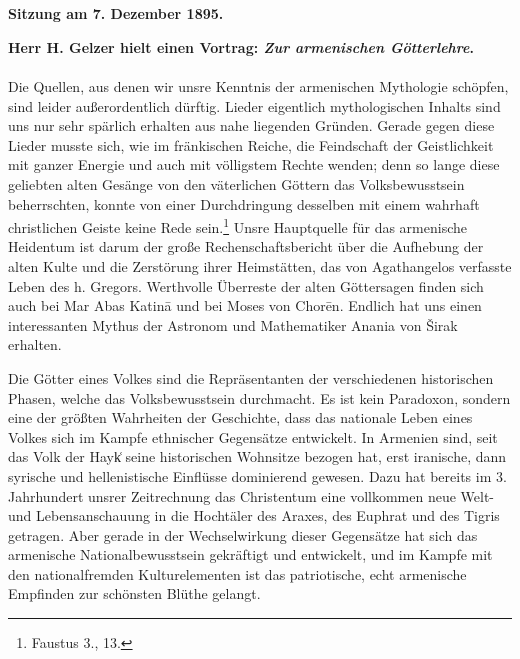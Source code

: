 \documentclass{article}
\begin{document}
\section*{}
\begin{center}
\Large
\textbf{Sitzung am 7. Dezember 1895.}

\textbf{Herr H. Gelzer hielt einen Vortrag: \emph{Zur armenischen Götterlehre}.}
\end{center}
\paragraph{}
Die Quellen, aus denen wir unsre Kenntnis der armenischen Mythologie schöpfen, sind leider außerordentlich dürftig. Lieder eigentlich mythologischen Inhalts sind uns nur sehr spärlich erhalten aus nahe liegenden Gründen. Gerade gegen diese Lieder musste sich, wie im fränkischen Reiche, die Feindschaft der Geistlichkeit mit ganzer Energie und auch mit völligstem Rechte wenden; denn so lange diese geliebten alten Gesänge von den väterlichen Göttern das Volksbewusstsein beherrschten, konnte von einer Durchdringung desselben mit einem wahrhaft christlichen Geiste keine Rede sein.\footnote{Faustus 3., 13.} Unsre Hauptquelle für das armenische Heidentum ist darum der große Rechenschaftsbericht über die Aufhebung der alten Kulte und die Zerstörung ihrer Heimstätten, das von Agathangelos verfasste Leben des h. Gregors. Werthvolle Überreste der alten Göttersagen finden sich auch bei Mar Abas Katinā und bei Moses von Chorēn. Endlich hat uns einen interessanten Mythus der Astronom und Mathematiker Anania von Širak erhalten.

Die Götter eines Volkes sind die Repräsentanten der verschiedenen historischen Phasen, welche das Volksbewusstsein durchmacht. Es ist kein Paradoxon, sondern eine der größten Wahrheiten der Geschichte, dass das nationale Leben eines Volkes sich im Kampfe ethnischer Gegensätze entwickelt. In Armenien sind, seit das Volk der Hayk͑ seine historischen Wohnsitze bezogen hat, erst iranische, dann syrische und hellenistische Einflüsse dominierend gewesen. Dazu hat bereits im 3. Jahrhundert unsrer Zeitrechnung das Christentum eine vollkommen neue Welt- und Lebensanschauung in die Hochtäler des Araxes, des Euphrat und des Tigris getragen. Aber gerade in der Wechselwirkung dieser Gegensätze hat sich das armenische Nationalbewusstsein gekräftigt und entwickelt, und im Kampfe mit den nationalfremden Kulturelementen ist das patriotische, echt armenische Empfinden zur schönsten Blüthe gelangt.
\end{document}
